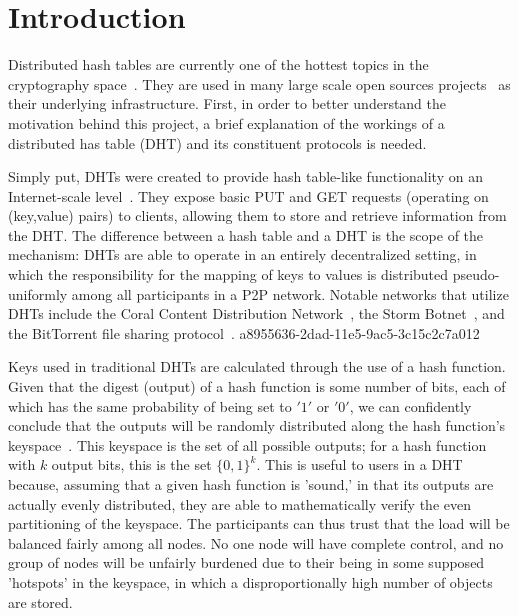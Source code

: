 \documentclass[12pt]{article}
\begin{document}
\section{Introduction}
\par Distributed hash tables are currently one of the hottest topics in the cryptography space~\cite{Stoica:2001dj,Rowstron:2001ea,Ratnasamy:2001wn}. They are used in many large scale open sources projects~\cite{Freitas:2013tb,Xu:2010vs,Perfitt:2010fh} as their underlying infrastructure. First, in order to better understand the motivation behind this project, a brief explanation of the workings of a distributed has table (DHT) and its constituent protocols is needed.

\par Simply put, DHTs were created to provide hash table-like functionality on an Internet-scale level~\cite{Ratnasamy:2001wn}. They expose basic PUT and GET requests (operating on (key,value) pairs) to clients, allowing them to store and retrieve information from the DHT. The difference between a hash table and a DHT is the scope of the mechanism: DHTs are able to operate in an entirely decentralized setting, in which the responsibility for the mapping of keys to values is distributed pseudo-uniformly among all participants in a P2P network. Notable networks that utilize DHTs include the Coral Content Distribution Network~\cite{Freedman:2004vb}, the Storm Botnet~\cite{Holz:2008uk}, and the BitTorrent file sharing protocol~\cite{Cohen:y1_8mBnw}.
a8955636-2dad-11e5-9ac5-3c15c2c7a012
\par Keys used in traditional DHTs are calculated through the use of a hash function. Given that the digest (output) of a hash function is some number of bits, each of which has the same probability of being set to $'1'$ or $'0'$, we can confidently conclude that the outputs will be randomly distributed along the hash function's keyspace~. This keyspace is the set of all possible outputs; for a hash function with $k$ output bits, this is the set $\{0,1\}^k$. This is useful to users in a DHT because, assuming that a given hash function is 'sound,' in that its outputs are actually evenly distributed, they are able to mathematically verify the even partitioning of the keyspace. The participants can thus trust that the load will be balanced fairly among all nodes. No one node will have complete control, and no group of nodes will be unfairly burdened due to their being in some supposed 'hotspots' in the keyspace, in which a disproportionally high number of objects are stored.~
\end{document}
